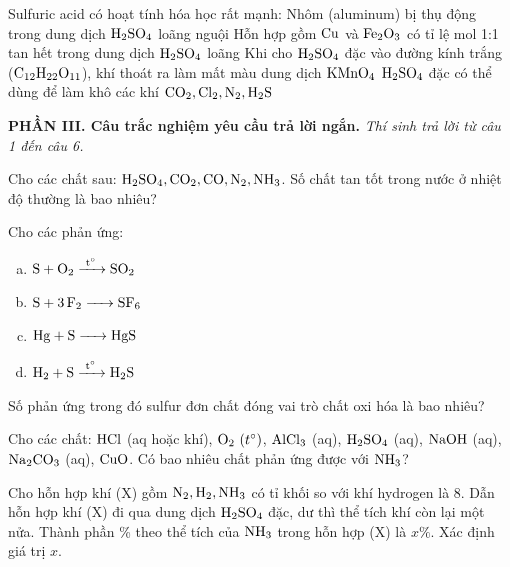 \documentclass[12pt,a4paper]{article}
\begin{document}
\begin{ex}
Sulfuric acid có hoạt tính hóa học rất mạnh:
\choiceTF
{Nhôm (aluminum) bị thụ động trong dung dịch $\ce{H2SO4}$ loãng nguội}
{\True Hỗn hợp gồm $\ce{Cu}$ và $\ce{Fe2O3}$ có tỉ lệ mol 1:1 tan hết trong dung dịch $\ce{H2SO4}$ loãng}
{\True Khi cho $\ce{H2SO4}$ đặc vào đường kính trắng ($\ce{C12H22O11}$), khí thoát ra làm mất màu dung dịch $\ce{KMnO4}$}
{$\ce{H2SO4}$ đặc có thể dùng để làm khô các khí $\ce{CO2, Cl2, N2, H2S}$}

\end{ex}

\vspace{0.3cm}
\noindent\textbf{\large PHẦN III. Câu trắc nghiệm yêu cầu trả lời ngắn.}
\textit{Thí sinh trả lời từ câu 1 đến câu 6.}
\vspace{0.2cm}

\begin{ex}
Cho các chất sau: $\ce{H2SO4, CO2, CO, N2, NH3}$. Số chất tan tốt trong nước ở nhiệt độ thường là bao nhiêu?

\vspace{1.0cm}

\end{ex}

\begin{ex}
Cho các phản ứng:
\begin{enumerate}[(a)]
	\item $\ce{S + O2 ->[t^\circ] SO2}$
	\item $\ce{S + 3F2 -> SF6}$
	\item $\ce{Hg + S -> HgS}$
	\item $\ce{H2 + S ->[t^\circ] H2S}$
\end{enumerate}
Số phản ứng trong đó sulfur đơn chất đóng vai trò chất oxi hóa là bao nhiêu?

\vspace{1.0cm}

\end{ex}

\begin{ex}
Cho các chất: $\ce{HCl}$ (aq hoặc khí), $\ce{O2}\ (t^\circ)$, $\ce{AlCl3}$ (aq), $\ce{H2SO4}$ (aq), $\ce{NaOH}$ (aq), $\ce{Na2CO3}$ (aq), $\ce{CuO}$. Có bao nhiêu chất phản ứng được với $\ce{NH3}$?

\vspace{1.5cm}

\end{ex}

\begin{ex}
Cho hỗn hợp khí (X) gồm $\ce{N2, H2, NH3}$ có tỉ khối so với khí hydrogen là 8. Dẫn hỗn hợp khí (X) đi qua dung dịch $\ce{H2SO4}$ đặc, dư thì thể tích khí còn lại một nửa. Thành phần \% theo thể tích của $\ce{NH3}$ trong hỗn hợp (X) là $x\%$. Xác định giá trị $x$.

\vspace{1.5cm}

\end{ex}
\end{document}
